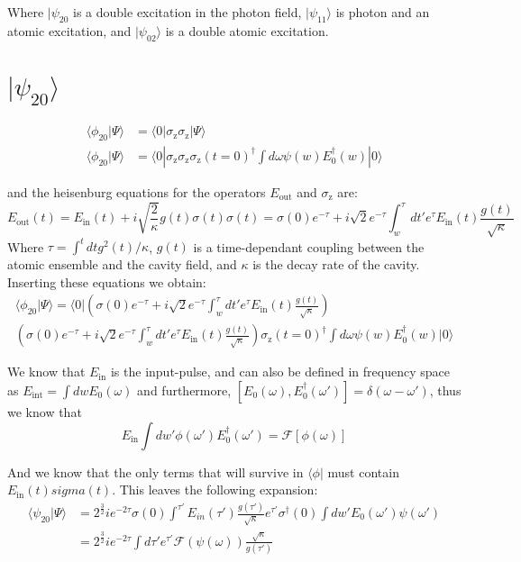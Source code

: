 \documentclass[12pt]{article}
\begin{document}
Where $| \psi_{20}$ is a double excitation in the photon field, $| \psi_{11} \rangle $ is photon and an atomic excitation, and $ | \psi_{02} \rangle $ is a double atomic excitation. 

\section{ $| \psi_{20} \rangle$}

\begin{align}
\langle \phi_{20}| \Psi \rangle &=\langle 0 | \sigma_\textrm{z} \sigma_\textrm{z} | \Psi \rangle\\
\langle \phi_{20}| \Psi \rangle &=\langle 0 | \sigma_\textrm{z} \sigma_\textrm{z} 
\sigma_\textrm{z}(t=0)^\dagger \int d\omega \psi(w) E_0^\dagger(w) | 0 \rangle
\end{align}

and the heisenburg equations for the operators $E_\textrm{out}$ and $\sigma_\textrm{z}$ are:
\begin{equation}
E_\textrm{out}(t) = E_\textrm{in}(t) + i \sqrt{\frac{2}{\kappa}} g(t) \sigma(t)
\sigma(t) = \sigma(0) e^{-\tau} + i\sqrt{2} e^{-\tau} \int^\tau_w d t' e^\tau E_\textrm{in}(t) \frac{g(t)}{\sqrt{\kappa}}
\end{equation}
Where $\tau = \int^t dt g^2(t)/\kappa$, $g(t)$ is a time-dependant coupling between the atomic ensemble and the cavity field, and $\kappa$ is the decay rate of the cavity. Inserting these equations we obtain:
\begin{multline}
\langle \phi_{20}| \Psi \rangle =\langle 0 | \left (  \sigma(0) e^{-\tau} + i\sqrt{2} e^{-\tau} \int^\tau_w d t' e^\tau E_\textrm{in}(t) \frac{g(t)}{\sqrt{\kappa}} \right )\\ \left ( \sigma(0) e^{-\tau} + i\sqrt{2} e^{-\tau} \int^\tau_w d t' e^\tau E_\textrm{in}(t) \frac{g(t)}{\sqrt{\kappa}} \right ) \sigma_\textrm{z}(t=0)^\dagger \int d\omega \psi(w) E_0^\dagger(w) | 0 \rangle
\end{multline}

We know that $E_\textrm{in}$ is the input-pulse, and can also be defined in frequency space as $E_\textrm{int} = \int dw E_0(\omega) $ and furthermore, $[E_0(\omega), E_0^\dagger(\omega') ] = \delta(\omega-\omega')$, thus we know that 
\begin{equation}
E_\textrm{in} \int dw' \phi(\omega') E_0^\dagger(\omega') = \mathscr{F}[\phi(\omega)]
\end{equation}

And we know that the only terms that will survive in $\langle \phi |$ must contain $E_\textrm{in}(t) sigma(t)$. This leaves the following expansion:
\begin{align}
\langle \psi_{20}| \Psi \rangle &= 2^{\frac{3}{2}} i e^{-2\tau} \sigma(0) 
\int^{\tau'} E_{in}(\tau') \frac{g(\tau')}{\sqrt{\kappa}} e^{\tau'} \sigma^\dagger(0) \int dw' E_0(\omega') \psi(\omega')\\ 
&= 2^{\frac{3}{2}} i e^{-2 \tau} \int d \tau' e^{\tau'} 
 \mathscr{F}(\psi(\omega)) \frac{\sqrt{\kappa}}{g(\tau')}
\end{align}
\end{document}
